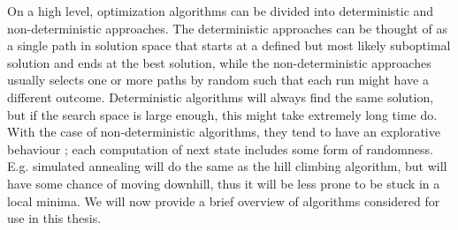 On a high level, optimization algorithms can be divided into deterministic and
non-deterministic approaches. The deterministic approaches can be thought of as
a single path in solution space that starts at a defined but most likely
suboptimal solution and ends at the best solution, while the non-deterministic
approaches usually selects one or more paths by random such that each run might
have a different outcome. Deterministic algorithms will always find the same
solution, but if the search space is large enough, this might take extremely
long time do.  With the case of non-deterministic algorithms, they tend to have
an explorative behaviour \cite{poli2008field}; each computation of next state
includes some form of randomness. E.g. simulated annealing will do the same as
the hill climbing algorithm, but will have some chance of moving downhill, thus
it will be less prone to be stuck in a local minima. We will now provide a brief
overview of algorithms considered for use in this thesis.


